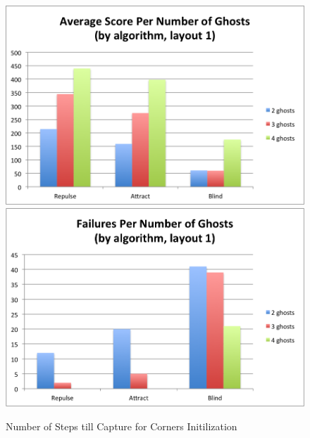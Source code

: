 \documentclass[11pt]{article}
\begin{document}
\begin{figure}[H]
	\includegraphics[width=0.5 \columnwidth]{stigmergytrendclassicscore.png}
	\includegraphics[width= 0.5 \columnwidth]{stigmergytrendclassicfail.png}
	\caption{Number of Steps till Capture for Corners Initilization}
\end{figure}
\end{document}
